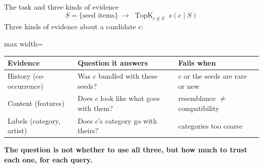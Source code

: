 \documentclass[10pt,aspectratio=169]{beamer}
\newcommand{\key}[1]{\textcolor{Accent}{\textbf{#1}}}
\begin{document}
\begin{frame}{The task and three kinds of evidence}
\[
 S=\{\text{seed items}\}\;\longrightarrow\;\operatorname{TopK}_{c\notin S}\; s(c\mid S)
\]
\vspace{2mm}
Three kinds of evidence about a candidate $c$:\par
\vspace{3mm}
\renewcommand{\arraystretch}{1.3}
\begin{adjustbox}{max width=\textwidth}\begin{tabular}{@{}>{\raggedright\arraybackslash}p{}>{\raggedright\arraybackslash}p{}>{\raggedright\arraybackslash}p{}@{}}
\toprule
\textbf{Evidence} & \textbf{Question it answers} & \textbf{Fails when}\\\midrule
History (co-occurrence) & Was $c$ bundled with these seeds? & $c$ or the seeds are rare or new\\
Content (features) & Does $c$ look like what goes with them? & resemblance $\neq$ compatibility\\
Labels (category, artist) & Does $c$'s category go with theirs? & categories too coarse\\\bottomrule
\end{tabular}\end{adjustbox}\par
\vspace{5mm}
\key{The question is not whether to use all three, but how much to trust each one, for each query.}
\end{frame}
\end{document}
